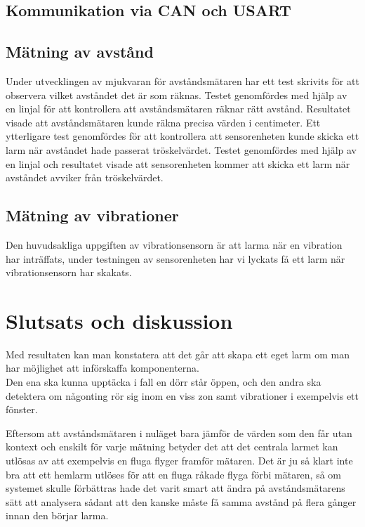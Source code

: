 \documentclass{article}
\begin{document}
\subsection{Kommunikation via CAN och USART}

\subsection{Mätning av avstånd}
Under utvecklingen av mjukvaran för avståndsmätaren har ett test skrivits för att observera vilket avståndet det är som räknas. 
Testet genomfördes med hjälp av en linjal för att kontrollera att avståndsmätaren räknar rätt avstånd. 
Resultatet visade att avståndsmätaren kunde räkna precisa värden i centimeter. 
Ett ytterligare test genomfördes för att kontrollera att sensorenheten kunde skicka ett larm när avståndet hade passerat tröskelvärdet. 
Testet genomfördes med hjälp av en linjal och resultatet visade att sensorenheten kommer att skicka ett larm när avståndet avviker från tröskelvärdet.

\subsection{Mätning av vibrationer}
Den huvudsakliga uppgiften av vibrationsensorn är att larma när en vibration har inträffats, under testningen av sensorenheten har vi lyckats få ett larm när vibrationsensorn har skakats.


\section{Slutsats och diskussion}
Med resultaten kan man konstatera att det går att skapa ett eget larm om man har möjlighet att införskaffa komponenterna.\\

\noindent
Den ena ska kunna upptäcka i fall en dörr står öppen, och den andra ska detektera om någonting rör sig inom en viss zon samt vibrationer i exempelvis ett fönster. 


\noindent
Eftersom att avståndsmätaren i nuläget bara jämför de värden som den får utan kontext och enskilt för varje mätning betyder det att det centrala larmet kan utlösas av att exempelvis en fluga flyger framför mätaren.
Det är ju så klart inte bra att ett hemlarm utlöses för att en fluga råkade flyga förbi mätaren, så om systemet skulle förbättras hade det varit smart att ändra på avståndsmätarens sätt att analysera sådant att den kanske måste få samma avstånd på flera gånger innan den börjar larma.\\
\end{document}
